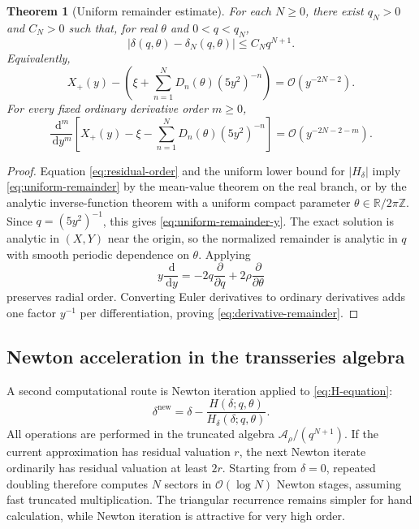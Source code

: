 \documentclass[11pt,oneside]{article}
\numberwithin{equation}{section}
\theoremstyle{plain}
\newtheorem{theorem}{Theorem}[section]
\theoremstyle{definition}
\theoremstyle{remark}
\newcommand{\dd}{\,\mathrm d}
\newcommand{\Ord}{\mathcal O}
\newcommand{\Talg}{\mathscr A_{\rho}}
\newcommand{\R}{\mathbb R}
\begin{document}
\begin{theorem}[Uniform remainder estimate]\label{thm:uniform-remainder}
For each \(N\ge0\), there exist \(q_N>0\) and \(C_N>0\) such that, for
real \(\theta\) and \(0<q<q_N\),
\begin{equation}\label{eq:uniform-remainder}
 \left|
 \delta(q,\theta)-\delta_N(q,\theta)
 \right|\le C_Nq^{N+1}.
\end{equation}
Equivalently,
\begin{equation}\label{eq:uniform-remainder-y}
 X_+(y)-\left(\xi+\sum_{n=1}^ND_n(\theta)(5y^2)^{-n}\right)
 =\Ord(y^{-2N-2}).
\end{equation}
For every fixed ordinary derivative order \(m\ge0\),
\begin{equation}\label{eq:derivative-remainder}
 \frac{\dd^m}{\dd y^m}
 \left[
 X_+(y)-\xi-\sum_{n=1}^ND_n(\theta)(5y^2)^{-n}
 \right]
 =\Ord(y^{-2N-2-m}).
\end{equation}
\end{theorem}

\begin{proof}
Equation \cref{eq:residual-order} and the uniform lower bound for
\(|H_\delta|\) imply \cref{eq:uniform-remainder} by the mean-value theorem
on the real branch, or by the analytic inverse-function theorem with a
uniform compact parameter \(\theta\in\R/2\pi\mathbb Z\).  Since
\(q=(5y^2)^{-1}\), this gives \cref{eq:uniform-remainder-y}.  The exact
solution is analytic in \((X,Y)\) near the origin, so the normalized
remainder is analytic in \(q\) with smooth periodic dependence on
\(\theta\).  Applying
\[
 y\frac{\dd}{\dd y}=-2q\frac{\partial}{\partial q}
 +2\rho\frac{\partial}{\partial\theta}
\]
preserves radial order.  Converting Euler derivatives to ordinary
derivatives adds one factor \(y^{-1}\) per differentiation, proving
\cref{eq:derivative-remainder}.
\end{proof}

\subsection{Newton acceleration in the transseries algebra}

A second computational route is Newton iteration applied to
\cref{eq:H-equation}:
\begin{equation}\label{eq:Newton-delta}
 \delta^{\mathrm{new}}
 =\delta-\frac{H(\delta;q,\theta)}{H_\delta(\delta;q,\theta)}.
\end{equation}
All operations are performed in the truncated algebra \(\Talg/(q^{N+1})\).
If the current approximation has residual valuation \(r\), the next Newton
iterate ordinarily has residual valuation at least \(2r\).  Starting from
\(\delta=0\), repeated doubling therefore computes \(N\) sectors in
\(\Ord(\log N)\) Newton stages, assuming fast truncated multiplication.
The triangular recurrence remains simpler for hand calculation, while
Newton iteration is attractive for very high order.
\end{document}
